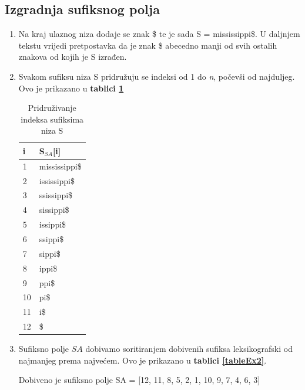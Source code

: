 \documentclass[a4paper,12pt]{article}
\begin{document}
\subsection{Izgradnja sufiksnog polja}

\begin{enumerate}
	\item Na kraj ulaznog niza dodaje se znak \$ te je sada S =  mississippi\$. U daljnjem tekstu vrijedi pretpostavka da je znak \$ abecedno manji od svih ostalih znakova od kojih je S izrađen.
	\item Svakom sufiksu niza S pridružuju se indeksi od 1 do \textit{n}, počevši od najduljeg. Ovo je prikazano u \textbf{tablici \ref{tableEx1}}

	\begin{table}[h!]
		\caption{Pridruživanje indeksa sufiksima niza S}
		\label{tableEx1}
		\begin{center}
			\begin{tabular}{ll}
				\toprule
				i & S$_{SA}$[i] \\
				\midrule
				1 & mississippi\$ \\
				2 & ississippi\$ \\
				3 & ssissippi\$ \\
				4 & sissippi\$ \\
				5 & issippi\$ \\
				6 & ssippi\$ \\
				7 & sippi\$ \\
				8 & ippi\$ \\
				9 & ppi\$ \\
				10 & pi\$ \\
				11 & i\$ \\
				12 & \$ \\
				\bottomrule
			\end{tabular}
		\end{center}
	\end{table}

	\item Sufiksno polje \(SA\) dobivamo soritiranjem dobivenih sufiksa leksikografski od najmanjeg prema najvećem. Ovo je prikazano u \textbf{tablici \ref{tableEx2}}.

	Dobiveno je sufiksno polje SA = [12, 11, 8, 5, 2, 1, 10, 9, 7, 4, 6, 3]


\end{enumerate}
\end{document}
